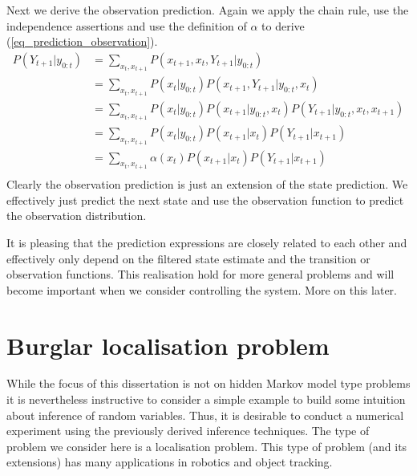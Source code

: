 Next we derive the observation prediction. Again we apply the chain rule, use the independence assertions and use the definition of $\alpha$ to derive (\ref{eq_prediction_observation}).
\begin{equation}
\begin{aligned}
P(Y_{t+1}|y_{0:t}) &= \sum_{x_t, x_{t+1}} P(x_{t+1}, x_t, Y_{t+1}|y_{0:t})\\
&= \sum_{x_t, x_{t+1}} P(x_t|y_{0:t})P(x_{t+1}, Y_{t+1}|y_{0:t}, x_t) \\
&= \sum_{x_t, x_{t+1}} P(x_t|y_{0:t})P(x_{t+1}|y_{0:t}, x_t)P(Y_{t+1}|y_{0:t}, x_t, x_{t+1}) \\
&= \sum_{x_t, x_{t+1}} P(x_t|y_{0:t})P(x_{t+1}|x_t)P(Y_{t+1}|x_{t+1}) \\
&= \sum_{x_t, x_{t+1}} \alpha(x_t)P(x_{t+1}|x_t)P(Y_{t+1}|x_{t+1}) \\
\end{aligned}
\label{eq_prediction_observation}
\end{equation}
Clearly the observation prediction is just an extension of the state prediction. We effectively just predict the next state and use the observation function to predict the observation distribution.

It is pleasing that the prediction expressions are closely related to each other and effectively only depend on the filtered state estimate and the transition or observation functions. This realisation hold for more general problems and will become important when we consider controlling the system. More on this later.

\section{Burglar localisation problem}
While the focus of this dissertation is not on hidden Markov model type problems it is nevertheless instructive to consider a simple example to build some intuition about inference of random variables. Thus, it is desirable to conduct a numerical experiment using the previously derived inference techniques. The type of problem we consider here is a localisation problem. This type of problem (and its extensions) has many applications in robotics and object tracking.

